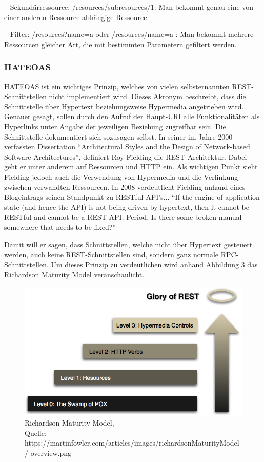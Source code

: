 –	Sekundärressource: /resources/subresources/1:	Man bekommt genau eine von einer anderen Ressource abhängige Ressource

–	Filter: /resources?name=a oder /resources/name=a : Man bekommt mehrere Ressourcen gleicher Art, die mit bestimmten Parametern gefiltert werden.

\subsubsection{HATEOAS}
\label{sec:RESTHATEOAS}

HATEOAS ist ein wichtiges Prinzip, welches von vielen selbsternannten \ac{REST}-Schnittstellen
nicht implementiert wird. Dieses Akronym beschreibt, dass die Schnittstelle über Hypertext
beziehungsweise Hypermedia angetrieben wird. Genauer gesagt, sollen durch den Aufruf
der Haupt-URI alle Funktionalitäten als Hyperlinks unter Angabe der jeweiligen Beziehung
zugreifbar sein. Die Schnittstelle dokumentiert sich sozusagen selbst.
In seiner im Jahre 2000 verfassten Dissertation “Architectural Styles and the Design of
Network-based Software Architectures”, definiert Roy Fielding die \ac{REST}-Architektur. Dabei
geht er unter anderem auf Ressourcen und \ac{HTTP} ein. Als wichtigen Punkt sieht Fielding
jedoch auch die Verwendung von Hypermedia und die Verlinkung zwischen verwandten Ressourcen.
In 2008 verdeutlicht Fielding anhand eines Blogeintrags seinen Standpunkt zu RESTful API’s...
“If the engine of application state (and hence the API) is not being driven by hypertext, then
it cannot be RESTful and cannot be a REST API. Period. Is there some broken manual
somewhere that needs to be fixed?” – \cite{.19.03.2017}

Damit will er sagen, dass Schnittstellen, welche nicht über Hypertext gesteuert werden, auch
keine \ac{REST}-Schnittstellen sind, sondern ganz normale RPC-Schnittstellen.
Um dieses Prinzip zu verdeutlichen wird anhand Abbildung 3 das Richardson Maturity Model
veranschaulicht.
 
\begin{figure}[!htb]
	\centering
	\includegraphics[scale=0.5]{hateoas.png}
	\caption[Richardson Maturity Model]{Richardson Maturity Model,\\ Quelle: https://martinfowler.com/articles/images/richardsonMaturityModel/ overview.png}
\end{figure}
 


